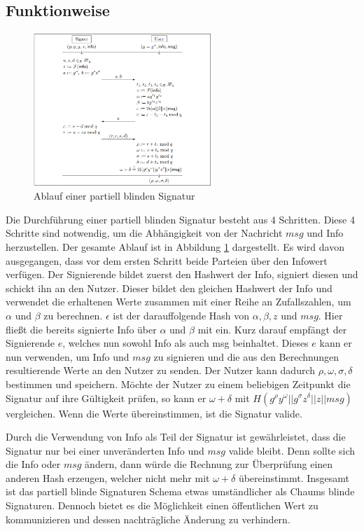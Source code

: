 \documentclass[
	fontsize=11pt,
	headings=small,
	parskip=half,           %
	bibliography=totoc,
	numbers=noenddot,       %
	open=any,               %
]{scrreprt}
\begin{document}
\subsection{Funktionweise}
\begin{figure}[h]
    \centering
    \includegraphics*[width=0.6\textwidth]{partBlindSig.png}
    \caption{Ablauf einer partiell blinden Signatur \cite{abe2000provably}}
    \label{fig:partBlindSig}
\end{figure}
Die Durchführung einer partiell blinden Signatur besteht aus 4 Schritten. Diese 4 Schritte sind notwendig, um die Abhängigkeit von der Nachricht $msg$ und Info herzustellen. Der gesamte Ablauf ist in Abbildung \ref{fig:partBlindSig} dargestellt. Es wird davon ausgegangen, dass vor dem ersten Schritt beide Parteien über den Infowert verfügen. Der Signierende bildet zuerst den Hashwert der Info, signiert diesen und schickt ihn an den Nutzer. Dieser bildet den gleichen Hashwert der Info und verwendet die erhaltenen Werte zusammen mit einer Reihe an Zufallszahlen, um $\alpha$ und $\beta$ zu berechnen. $\epsilon$ ist der darauffolgende Hash von $\alpha,\beta,z$ und $msg$. Hier fließt die bereits signierte Info über $\alpha$ und $\beta$ mit ein. Kurz darauf empfängt der Signierende $e$, welches nun sowohl Info als auch msg beinhaltet. Dieses $e$ kann er nun verwenden, um Info und $msg$ zu signieren und die aus den Berechnungen resultierende Werte an den Nutzer zu senden. Der Nutzer kann dadurch $\rho,\omega,\sigma,\delta$ bestimmen und speichern. Möchte der Nutzer zu einem beliebigen Zeitpunkt die Signatur auf ihre Gültigkeit prüfen, so kann er $\omega + \delta$ mit  $H (g^\rho y^\omega || g^\sigma z^\delta || z || msg)$ vergleichen. Wenn die Werte übereinstimmen, ist die Signatur valide.

Durch die Verwendung von Info als Teil der Signatur ist gewährleistet, dass die Signatur nur bei einer unveränderten Info und $msg$ valide bleibt. Denn sollte sich die Info oder $msg$ ändern, dann würde die Rechnung zur Überprüfung einen anderen Hash erzeugen, welcher nicht mehr mit $\omega+\delta$ übereinstimmt. Insgesamt ist das partiell blinde Signaturen Schema etwas umständlicher als Chaums blinde Signaturen. Dennoch bietet es die Möglichkeit einen öffentlichen Wert zu kommunizieren und dessen nachträgliche Änderung zu verhindern.
\end{document}

